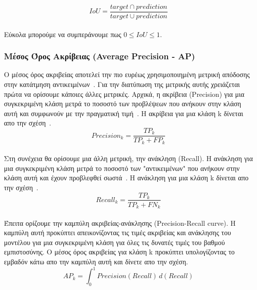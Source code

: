 \documentclass[12pt]{article}
\numberwithin{equation}{section}
\begin{document}
\begin{equation}
    IoU = \frac{target \cap prediction}{target \cup prediction}
\end{equation}
\\
Εύκολα μπορούμε να συμπεράνουμε πως \(0 \leq IoU \leq 1\).\\

\subsubsection{Μέσος Όρος Ακρίβειας (Average Precision - AP)}

Ο μέσος όρος ακριβείας αποτελεί την πιο ευρέως χρησιμοποιημένη μετρική απόδοσης στην κατάτμηση αντικειμένων~\cite{Kookna2022Segmentation}. Για την διατύπωση της μετρικής αυτής χρειάζεται πρώτα να ορίσουμε κάποιες άλλες μετρικές. Αρχικά, η ακρίβεια (Precision) για μια συγκεκριμένη κλάση μετρά το ποσοστό των προβλέψεων που ανήκουν στην κλάση αυτή και συμφωνούν με την πραγματική τιμή~\cite{Bex2021MulticlassMetrics}. Η ακρίβεια για μια κλάση k δίνεται απο την σχέση~\cite{grandini2020metricsmulticlassclassificationoverview}. \\

\begin{equation}
Precision_k = \frac{TP_k}{TP_k + FP_k}
\end{equation}\\

\noindent Στη συνέχεια θα ορίσουμε μια άλλη μετρική, την ανάκληση (Recall). Η ανάκληση για μια συγκεκριμένη κλάση μετρά το ποσοστό των "αντικειμένων" που ανήκουν στην κλάση αυτή και έχουν προβλεφθεί σωστά~\cite{Bex2021MulticlassMetrics}. Η ανάκληση για μια κλάση k δίνεται απο την σχέση~\cite{grandini2020metricsmulticlassclassificationoverview}.\\

\begin{equation}
Recall_k = \frac{TP_k}{TP_k + FN_k}
\end{equation}\\

Έπειτα ορίζουμε την καμπύλη ακριβείας-ανάκλησης (Precision-Recall curve). Η καμπύλη αυτή προκύπτει απεικονίζοντας τις τιμές ακριβείας και ανάκλησης του μοντέλου για μια συγκεκριμένη κλάση για όλες τις δυνατές τιμές του βαθμού εμπιστοσύνης. Ο μέσος όρος ακριβείας για κλάση k προκύπτει υπολογίζοντας το εμβαδόν κάτω απο την καμπύλη αυτή και δίνετε απο την σχέση.\\

\begin{equation}
AP_k = \int_{0}^{1} Precision(Recall) \, d(Recall)
\end{equation} \\
\end{document}

